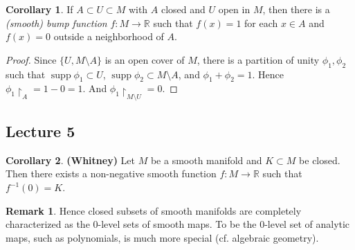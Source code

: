 \documentclass[10pt,letterpaper,cm]{nupset}
\theoremstyle{definition}
\newtheorem{remark}{Remark}
\newtheorem{corollary}{Corollary}
\newcommand{\R}{\mathbb R}
\newcommand{\1}{\mathbf{1}}
\newcommand{\0}{\vec 0}
\DeclareMathOperator{\supp}{supp}
\begin{document}
\begin{corollary}
If $A \subset U \subset M$ with $A$ closed and $U$ open in $M$, then there is a  \textit{(smooth) bump function} $f: M \to \R$ such that $f(x) = 1$ for each $x\in A$ and $f(x) =0$ outside a neighborhood of $A$.
\end{corollary}

\begin{proof}
Since $\{U, M \setminus A\}$ is an open cover of $M$, there is a partition of unity $\phi_1, \phi_2$ such that $\supp \phi_1 \subset U$, $\supp \phi_2 \subset M \setminus A$, and $\phi_1 + \phi_2 = 1$. Hence $\phi_1 \restriction_A = 1 - 0 = 1$. And $\phi_1 \restriction_{M\setminus U} = 0$.
\end{proof}

\subsection{Lecture 5}

\begin{corollary}{\textbf{(Whitney)}}
Let $M$ be a smooth manifold and $K \subset M$ be closed. Then there exists a non-negative smooth function $f: M \to \R$ such that $f^{-1}(0) =K$.
\end{corollary}

\begin{remark}
Hence closed subsets of smooth manifolds are completely characterized as the $0$-level sets of smooth maps. To be the $0$-level set of analytic maps, such as polynomials, is much more special (cf. algebraic geometry).
\end{remark}
\end{document}

